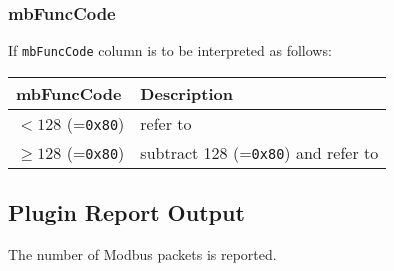 \documentclass[documentation]{subfiles}
\begin{document}
\subsubsection{mbFuncCode}\label{mbFuncCode}
If {\tt mbFuncCode} column is to be interpreted as follows:
\begin{longtable}{ll}
    \toprule
    {\bf mbFuncCode} & {\bf Description}\\
    \midrule\endhead%
    $< 128$ (={\tt 0x80}) & refer to \nameref{modbusFC}\\
    $\geq 128$ (={\tt 0x80}) & subtract 128 (={\tt 0x80}) and refer to \nameref{modbusFEx}\\
    \bottomrule
\end{longtable}

\subsection{Plugin Report Output}
The number of Modbus packets is reported.
\end{document}
